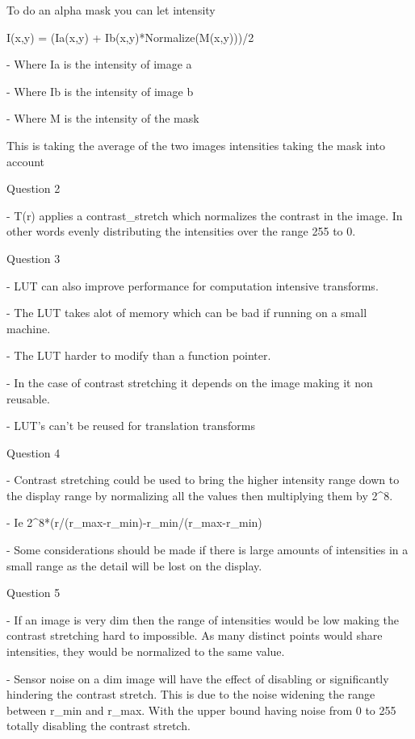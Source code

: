 \documentclass[
]{article}
\begin{document}
To do an alpha mask you can let intensity

I(x,y) = (Ia(x,y) + Ib(x,y)*Normalize(M(x,y)))/2

- Where Ia is the intensity of image a

- Where Ib is the intensity of image b

- Where M is the intensity of the mask

This is taking the average of the two images intensities taking the mask
into account

Question 2

- T(r) applies a contrast\_stretch which normalizes the contrast in the
image. In other words evenly distributing the intensities over the range
255 to 0.

Question 3

- LUT can also improve performance for computation intensive transforms.

- The LUT takes alot of memory which can be bad if running on a small
machine.

- The LUT harder to modify than a function pointer.

- In the case of contrast stretching it depends on the image making it
non reusable.

- LUT's can't be reused for translation transforms

Question 4

- Contrast stretching could be used to bring the higher intensity range
down to the display range by normalizing all the values then multiplying
them by 2\^{}8.

- Ie 2\^{}8*(r/(r\_max-r\_min)-r\_min/(r\_max-r\_min)

- Some considerations should be made if there is large amounts of
intensities in a small range as the detail will be lost on the display.

Question 5

- If an image is very dim then the range of intensities would be low
making the contrast stretching hard to impossible. As many distinct
points would share intensities, they would be normalized to the same
value.

- Sensor noise on a dim image will have the effect of disabling or
significantly hindering the contrast stretch. This is due to the noise
widening the range between r\_min and r\_max. With the upper bound
having noise from 0 to 255 totally disabling the contrast stretch.
\end{document}

